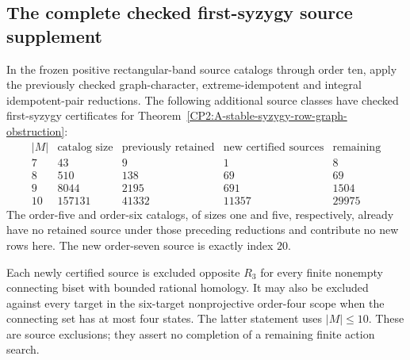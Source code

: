 \subsection{The complete checked first-syzygy source supplement}

\begin{theorem}
\label{CP2:A-stable-syzygy-source-scope}
In the frozen positive rectangular-band source catalogs through
order ten, apply the previously checked graph-character,
extreme-idempotent and integral idempotent-pair reductions.
The following additional source classes have checked first-syzygy
certificates for
Theorem~\ref{CP2:A-stable-syzygy-row-graph-obstruction}:
\[
\begin{array}{c|r|r|r|r}
 |M|&\text{catalog size}&\text{previously retained}
      &\text{new certified sources}&\text{remaining}\\\hline
 7&43&9&1&8\\
 8&510&138&69&69\\
 9&8044&2195&691&1504\\
 10&157131&41332&11357&29975
\end{array}
\]
The order-five and order-six catalogs, of sizes one and five,
respectively, already have no retained source under those preceding
reductions and contribute no new rows here.  The new order-seven
source is exactly index $20$.

Each newly certified source is excluded opposite $R_3$ for every
finite nonempty connecting biset with bounded rational homology.
It may also be excluded against every target in the six-target
nonprojective order-four scope when the connecting set has at most
four states.  The latter statement uses $|M|\le10$.
These are source exclusions; they assert no completion of a
remaining finite action search.
\end{theorem}
